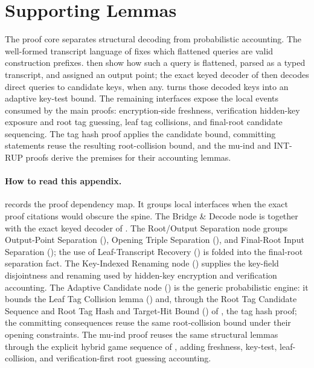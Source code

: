\section{Supporting Lemmas}
\label{app:lemmas}

The proof core separates structural decoding from probabilistic
accounting. The well-formed transcript language of
 fixes which flattened queries are valid \TW{}
construction prefixes.
 then show
how such a query is flattened, parsed as a typed transcript, and
assigned an output point; the exact keyed decoder of
 then decodes direct queries to candidate keys,
when any.
 turns those decoded keys into an adaptive key-test
bound. The remaining interfaces expose the local events consumed by the
main proofs: encryption-side freshness, verification hidden-key exposure
and root tag guessing, leaf tag collisions, and final-root candidate
sequencing. The tag hash proof applies the candidate bound, committing
statements reuse the resulting root-collision bound, and the mu-ind and
\textsf{INT-RUP} proofs derive the premises for their accounting lemmas.

\paragraph{How to read this appendix.}
 records the proof dependency map. It groups local
interfaces when the exact proof citations would obscure the spine. The
Bridge \& Decode node is  together with the
exact keyed decoder of . The Root/Output
Separation node groups Output-Point Separation (),
Opening Triple Separation (), and Final-Root Input
Separation (); the use of Leaf-Transcript
Recovery () is folded into the final-root
separation fact. The Key-Indexed Renaming node ()
supplies the key-field disjointness and renaming used by hidden-key
encryption and verification accounting. The Adaptive Candidate node
() is the generic probabilistic engine: it
bounds the Leaf Tag Collision lemma () and,
through the Root Tag Candidate Sequence and Root Tag Hash and Target-Hit Bound
() of ,
the tag hash proof; the committing consequences reuse the same root-collision
bound under their opening constraints. The mu-ind proof reuses the same
structural lemmas through the explicit hybrid game sequence of
, adding freshness, key-test, leaf-collision,
and verification-first root guessing accounting.

